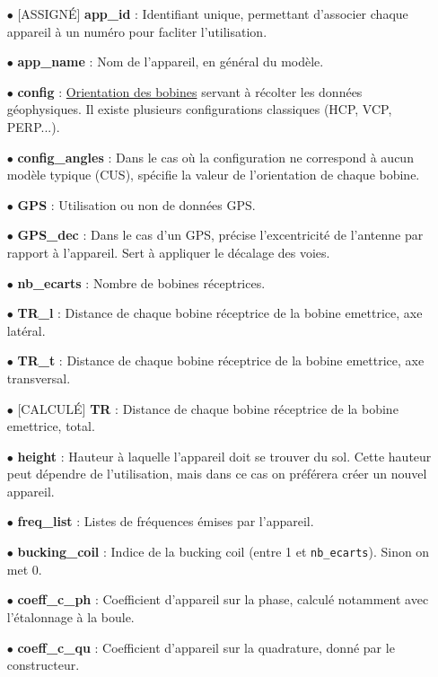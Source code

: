 \documentclass[12pt]{article}
\begin{document}
    \begin{enumerate}
        \item[$\bullet$] [ASSIGNÉ] \textbf{app\_id} : Identifiant unique, permettant d'associer chaque appareil à un numéro pour facliter l'utilisation.
        \item[$\bullet$] \textbf{app\_name} : Nom de l'appareil, en général du modèle.
        \item[$\bullet$] \textbf{config} : \href{https://fr.wikipedia.org/wiki/G%C3%A9ophysique_appliqu%C3%A9e#Prospection_%C3%A9lectromagn%C3%A9tique}{Orientation des bobines} servant à récolter les données géophysiques. Il existe plusieurs configurations classiques (HCP, VCP, PERP...).
        \item[$\bullet$] \textbf{config\_angles} : Dans le cas où la configuration ne correspond à aucun modèle typique (CUS), spécifie la valeur de l'orientation de chaque bobine.
        \item[$\bullet$] \textbf{GPS} : Utilisation ou non de données GPS.
        \item[$\bullet$] \textbf{GPS\_dec} : Dans le cas d'un GPS, précise l'excentricité de l'antenne par rapport à l'appareil. Sert à appliquer le décalage des voies.
        \item[$\bullet$] \textbf{nb\_ecarts} : Nombre de bobines réceptrices.
        \item[$\bullet$] \textbf{TR\_l} : Distance de chaque bobine réceptrice de la bobine emettrice, axe latéral.
        \item[$\bullet$] \textbf{TR\_t} : Distance de chaque bobine réceptrice de la bobine emettrice, axe transversal.
        \item[$\bullet$] [CALCULÉ] \textbf{TR} : Distance de chaque bobine réceptrice de la bobine emettrice, total.
        \item[$\bullet$] \textbf{height} : Hauteur à laquelle l'appareil doit se trouver du sol. Cette hauteur peut dépendre de l'utilisation, mais dans ce cas on préférera créer un nouvel appareil.
        \item[$\bullet$] \textbf{freq\_list} : Listes de fréquences émises par l'appareil.
        \item[$\bullet$] \textbf{bucking\_coil} : Indice de la bucking coil (entre 1 et \texttt{nb\_ecarts}). Sinon on met 0.
        \item[$\bullet$] \textbf{coeff\_c\_ph} : Coefficient d'appareil sur la phase, calculé notamment avec l'étalonnage à la boule.
        \item[$\bullet$] \textbf{coeff\_c\_qu} : Coefficient d'appareil sur la quadrature, donné par le constructeur.
    \end{enumerate}
\end{document}
